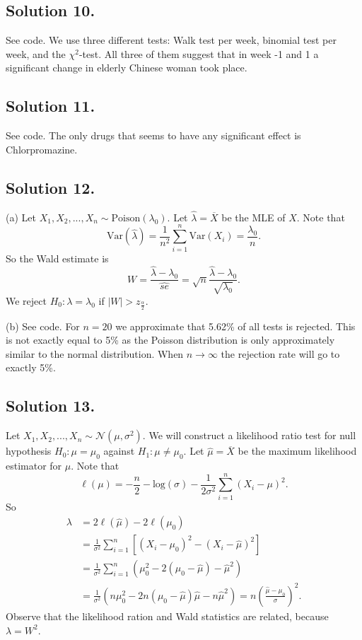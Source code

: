 \subsection*{Solution 10.}

See code.
We use three different tests: Walk test per week, binomial test per week, and the $\chi^2$-test.
All three of them suggest that in week -1 and 1 a significant change in elderly Chinese woman took place.


\subsection*{Solution 11.}

See code.
The only drugs that seems to have any significant effect is Chlorpromazine.


\subsection*{Solution 12.}

(a) Let $X_1, X_2, ..., X_n \sim \mathrm{Poison}(\lambda_0)$.
Let $\hat{\lambda} = \overline{X}$ be the MLE of $X$.
Note that
$$
\mathrm{Var}(\hat{\lambda}) = \frac{1}{n^2} \sum_{i=1}^n \mathrm{Var}(X_i) = \frac{\lambda_0}{n}.
$$
So the Wald estimate is
$$
W = \frac{\hat{\lambda} - \lambda_0}{\hat{se}} = \sqrt{n} \frac{\hat{\lambda} - \lambda_0}{\sqrt{\lambda_0}}.
$$
We reject $H_0: \lambda = \lambda_0$ if $|W| > z_{\frac{\alpha}{2}}$.

(b) See code.
For $n = 20$ we approximate that 5.62\% of all tests is rejected.
This is not exactly equal to 5\% as the Poisson distribution is only approximately similar to the normal distribution.
When $n \to \infty$ the rejection rate will go to exactly 5\%.


\subsection*{Solution 13.}

Let $X_1, X_2, ..., X_n \sim \mathcal{N}(\mu, \sigma^2)$.
We will construct a likelihood ratio test for null hypothesis $H_0: \mu = \mu_0$ against $H_1: \mu \neq \mu_0$.
Let $\hat{\mu} = \overline{X}$ be the maximum likelihood estimator for $\mu$.
Note that
$$
\ell(\mu) = -\frac{n}{2} - \mathrm{log}(\sigma) - \frac{1}{2\sigma^2} \sum_{i=1}^n (X_i - \mu)^2.
$$
So
\begin{equation*}
\begin{split}
\lambda &= 2\ell(\hat{\mu}) - 2\ell(\mu_0) \\
    &= \frac{1}{\sigma^2} \sum_{i=1}^n \left[ (X_i - \mu_0)^2 - (X_i - \hat{\mu})^2 \right] \\
    &= \frac{1}{\sigma^2} \sum_{i=1}^n (\mu_0^2 - 2(\mu_0 - \hat{\mu}) - \hat{\mu}^2) \\
    &= \frac{1}{\sigma^2} (n\mu_0^2 - 2n(\mu_0 - \hat{\mu})\hat{\mu} - n\hat{\mu}^2)
    = n \left(\frac{\hat{\mu} - \mu_0}{\sigma}\right)^2.
\end{split}
\end{equation*}
Observe that the likelihood ration and Wald statistics are related, because $\lambda = W^2$.
